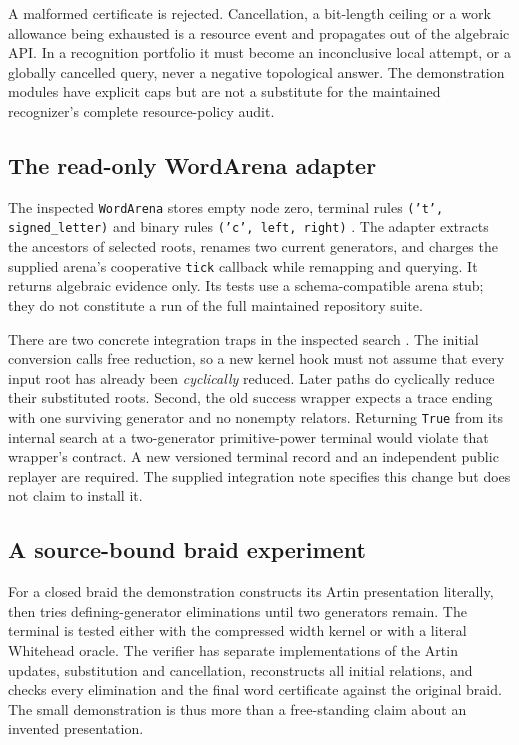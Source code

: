 \documentclass[11pt,letterpaper]{article}
\theoremstyle{definition}
\begin{document}
A malformed certificate is rejected. Cancellation, a bit-length ceiling or
a work allowance being exhausted is a resource event and propagates out of
the algebraic API. In a recognition portfolio it must become an inconclusive
local attempt, or a globally cancelled query, never a negative topological
answer. The demonstration modules have explicit caps but are not a substitute
for the maintained recognizer's complete resource-policy audit.

\subsection{The read-only WordArena adapter}
The inspected \texttt{WordArena} stores empty node zero, terminal rules
\texttt{('t', signed\_letter)} and binary rules \texttt{('c', left, right)}
\cite{RepoWords}. The adapter extracts the ancestors of selected roots,
renames two current generators, and charges the supplied arena's cooperative
\texttt{tick} callback while remapping and querying. It returns algebraic
evidence only. Its tests use a schema-compatible arena stub; they do not
constitute a run of the full maintained repository suite.

There are two concrete integration traps in the inspected search
\cite{RepoSearch}. The initial conversion calls free reduction, so a new
kernel hook must not assume that every input root has already been
\emph{cyclically} reduced. Later paths do cyclically reduce their substituted
roots. Second, the old success wrapper expects a trace ending with one
surviving generator and no nonempty relators. Returning \texttt{True} from
its internal search at a two-generator primitive-power terminal would violate
that wrapper's contract. A new versioned terminal record and an independent
public replayer are required. The supplied integration note specifies this
change but does not claim to install it.

\subsection{A source-bound braid experiment}
For a closed braid the demonstration constructs its Artin presentation
literally, then tries defining-generator eliminations until two generators
remain. The terminal is tested either with the compressed width kernel or
with a literal Whitehead oracle. The verifier has separate implementations
of the Artin updates, substitution and cancellation, reconstructs all
initial relations, and checks every elimination and the final word
certificate against the original braid. The small demonstration is thus
more than a free-standing claim about an invented presentation.
\end{document}
